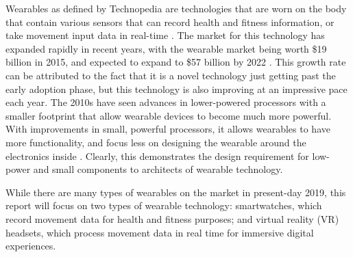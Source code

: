Wearables as defined by Technopedia are technologies that are worn on
the body that contain various sensors that can record health and fitness
information, or take movement input data in real-time \cite{technopedia_defn}.
The market for this technology has expanded rapidly in recent years, with the
wearable market being worth \$19 billion in 2015, and expected to expand to \$57 billion
by 2022 \cite{market_growth}. This growth rate can be attributed to the fact that it is a novel
technology just getting past the early adoption phase, but this technology is also improving
at an impressive pace each year. The 2010s have seen advances in lower-powered processors with 
a smaller footprint that allow wearable devices to become much more powerful. With improvements in
small, powerful processors, it allows wearables to have more functionality, and focus less on
designing the wearable around the electronics inside \cite{wearable_rev}. Clearly, this demonstrates
the design requirement for low-power and small components to architects of wearable technology.

While there are many types of wearables on the market in present-day 2019, this report will
focus on two types of wearable technology: smartwatches, which record movement data
for health and fitness purposes; and virtual reality (VR) headsets, which process
movement data in real time for immersive digital experiences.